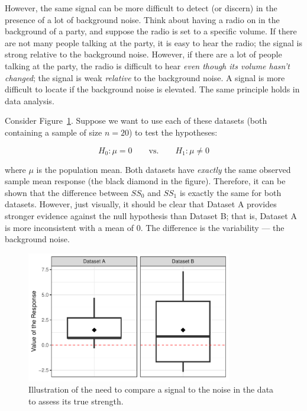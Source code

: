 \documentclass[
  letterpaper,
  DIV=11,
  numbers=noendperiod]{scrreprt}
\theoremstyle{plain}
\theoremstyle{definition}
\theoremstyle{definition}
\theoremstyle{remark}
\begin{document}
However, the same signal can be more difficult to detect (or discern) in
the presence of a lot of background noise. Think about having a radio on
in the background of a party, and suppose the radio is set to a specific
volume. If there are not many people talking at the party, it is easy to
hear the radio; the signal is strong relative to the background noise.
However, if there are a lot of people talking at the party, the radio is
difficult to hear \emph{even though its volume hasn't changed}; the
signal is weak \emph{relative} to the background noise. A signal is more
difficult to locate if the background noise is elevated. The same
principle holds in data analysis.

Consider Figure~\ref{fig-teststat-signal-to-noise}. Suppose we want to
use each of these datasets (both containing a sample of size \(n = 20\))
to test the hypotheses:

\[H_0: \mu = 0 \qquad \text{vs.} \qquad H_1: \mu \neq 0\]

where \(\mu\) is the population mean. Both datasets have \emph{exactly}
the same observed sample mean response (the black diamond in the
figure). Therefore, it can be shown that the difference between \(SS_0\)
and \(SS_1\) is exactly the same for both datasets. However, just
visually, it should be clear that Dataset A provides stronger evidence
against the null hypothesis than Dataset B; that is, Dataset A is more
inconsistent with a mean of 0. The difference is the variability --- the
background noise.

\begin{figure}

{\centering \includegraphics[width=0.8\textwidth,height=\textheight]{./images/fig-teststat-signal-to-noise-1.pdf}

}

\caption{\label{fig-teststat-signal-to-noise}Illustration of the need to
compare a signal to the noise in the data to assess its true strength.}

\end{figure}
\end{document}

